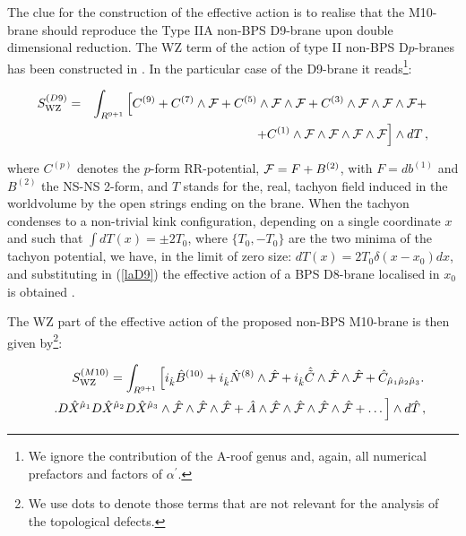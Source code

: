 \documentclass[12pt,a4paper]{article}
\begin{document}
The clue for the construction of the effective action is to realise
that the M10-brane should reproduce
the Type IIA non-BPS D9-brane \cite{Horava} upon double dimensional 
reduction. The WZ term of the action of type II non-BPS D$p$-branes 
has been constructed in \cite{BCR}. In the particular case
of the D9-brane it reads\footnote{We
ignore the contribution of the A-roof genus and, again,
all numerical prefactors and factors of $\alpha^\prime$.}:

\begin{eqnarray}
\label{laD9}
S^{(D9)}_{\rm WZ}&=&\int_{R^{9+1}}\left[ C^{(9)}+C^{(7)}\wedge {\cal F}+
C^{(5)}\wedge {\cal F}\wedge {\cal F}+C^{(3)}\wedge {\cal F}
\wedge {\cal F}\wedge {\cal F}+\right.\nonumber\\
&&\left. +C^{(1)}\wedge {\cal F}\wedge {\cal F}\wedge {\cal F}
\wedge {\cal F}\right] \wedge dT\, ,
\end{eqnarray}

\noindent where $C^{(p)}$ denotes the $p$-form RR-potential,
${\cal F}=F+B^{(2)}$, with $F=db^{(1)}$ and $B^{(2)}$ the NS-NS 2-form,
and $T$ stands for 
the, real, tachyon field induced in the worldvolume by the open
strings ending on the brane. When the tachyon
condenses to a non-trivial kink configuration, depending on a single
coordinate $x$ and such that $\int dT(x)=\pm 2T_0$, where
$\{T_0,-T_0\}$ are the two minima of the tachyon potential, we
have, in the limit of zero size: $dT(x)=2T_0\delta (x-x_0)dx$,
and substituting in (\ref{laD9}) the effective action of a BPS D8-brane
localised in $x_0$ is obtained \cite{BCR}.

The WZ part of the effective action of the proposed non-BPS M10-brane is 
then given by\footnote{We use dots to denote those terms that
are not relevant for the analysis of the topological defects.}:

\begin{eqnarray}
\label{M10WZ}
&&S^{(M10)}_{\rm WZ}=\int_{R^{9+1}}\left[ i_{\hat k}{\hat B}^{(10)}+
i_{\hat k}{\hat N}^{(8)}\wedge {\hat {\cal F}}+i_{\hat k}{\hat {\tilde C}}
\wedge {\hat {\cal F}}\wedge {\hat {\cal F}}+ 
{\hat C}_{{\hat \mu}_1{\hat \mu}_2{\hat \mu}_3}.\right. \\ 
&&\left. .D{\hat X}^{{\hat \mu}_1}D{\hat X}^{{\hat \mu}_2}
D{\hat X}^{{\hat \mu}_3}\wedge
{\hat {\cal F}}\wedge {\hat {\cal F}}\wedge {\hat {\cal F}}+
{\hat A}\wedge {\hat {\cal F}}\wedge {\hat {\cal F}}
\wedge {\hat {\cal F}}\wedge {\hat {\cal F}}+\dots \right]\wedge d{\hat T}\, ,
\nonumber
\end{eqnarray}
\end{document}
